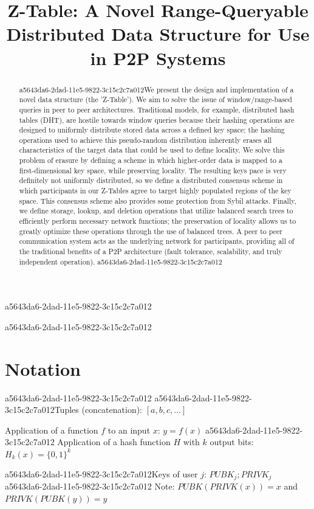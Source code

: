 \documentclass[12pt]{article}
\title{Z-Table: A Novel Range-Queryable Distributed Data Structure for Use in P2P Systems}
\begin{document}
a5643da6-2dad-11e5-9822-3c15c2c7a012\maketitle

\begin{abstract}
a5643da6-2dad-11e5-9822-3c15c2c7a012We present the design and implementation of a novel data structure (the 'Z-Table'). We aim to solve the issue of window/range-based queries in peer to peer architectures. Traditional models, for example,  distributed hash tables (DHT), are hostile towards window queries because their hashing operations are designed to uniformly distribute stored data across a defined key space; the hashing operations used to achieve this pseudo-random distribution inherently erases all characteristics of the target data that could be used to define locality. We solve this problem of erasure by defining a scheme in which higher-order data is mapped to a first-dimensional key space, while preserving locality. The resulting keys pace is very definitely not uniformly distributed, so we define a distributed consensus scheme in which participants in our Z-Tables agree to target highly populated regions of the key space. This consensus scheme also provides some protection from Sybil attacks. Finally, we define storage, lookup, and deletion operations that utilize balanced search trees to efficiently perform necessary network functions; the preservation of locality allows us to greatly optimize these operations through the use of balanced trees. A peer to peer communication system acts as the underlying network for participants, providing all of the traditional benefits of a P2P architecture (fault tolerance, scalability, and truly independent operation).
a5643da6-2dad-11e5-9822-3c15c2c7a012\end{abstract}
a5643da6-2dad-11e5-9822-3c15c2c7a012
\section{Notation}
a5643da6-2dad-11e5-9822-3c15c2c7a012
a5643da6-2dad-11e5-9822-3c15c2c7a012Tuples (concatenation): $[a,b,c,...]$

Application of a function $f$ to an input $x$: $y=f(x)$
a5643da6-2dad-11e5-9822-3c15c2c7a012
Application of a hash function $H$ with $k$ output bits: $H_{k}(x) = \{0,1\}^k$

a5643da6-2dad-11e5-9822-3c15c2c7a012Keys of user $j$: $ PUBK_j; PRIVK_j $
a5643da6-2dad-11e5-9822-3c15c2c7a012
Note: $PUBK(PRIVK(x)) = x$ and $PRIVK(PUBK(y)) = y$~
\end{document}
